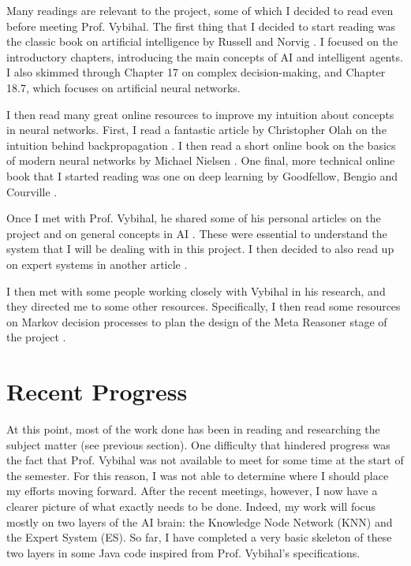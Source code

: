\documentclass[]{article}
\begin{document}
Many readings are relevant to the project, some of which I decided to read even before meeting Prof. Vybihal. The first thing that I decided to start reading was the classic book on artificial intelligence by Russell and Norvig \cite{russell2016artificial}. I focused on the introductory chapters, introducing the main concepts of AI and intelligent agents. I also skimmed through Chapter 17 on complex decision-making, and Chapter 18.7, which focuses on artificial neural networks.

I then read many great online resources to improve my intuition about concepts in neural networks. First, I read a fantastic article by Christopher Olah on the intuition behind backpropagation \cite{colah2015}. I then read a short online book on the basics of modern neural networks by Michael Nielsen \cite{nielsen2015}. One final, more technical online book that I started reading was one on deep learning by Goodfellow, Bengio and Courville \cite{Goodfellow-et-al-2016}.

Once I met with Prof. Vybihal, he shared some of his personal articles on the project and on general concepts in AI \cite{vybihal-expert,vybihal-model,vybihal-perceptron,vybihal-swarm}. These were essential to understand the system that I will be dealing with in this project. I then decided to also read up on expert systems in another article \cite{tripathi2011review}.

I then met with some people working closely with Vybihal in his research, and they directed me to some other resources. Specifically, I then read some resources on Markov decision processes to plan the design of the Meta Reasoner stage of the project \cite{kolobov2012planning}.

\section{Recent Progress}

At this point, most of the work done has been in reading and researching the subject matter (see previous section). One difficulty that hindered progress was the fact that Prof. Vybihal was not available to meet for some time at the start of the semester. For this reason, I was not able to determine where I should place my efforts moving forward. After the recent meetings, however, I now have a clearer picture of what exactly needs to be done. Indeed, my work will focus mostly on two layers of the AI brain: the Knowledge Node Network (KNN) and the Expert System (ES). So far, I have completed a very basic skeleton of these two layers in some Java code inspired from Prof. Vybihal's specifications.
\end{document}
